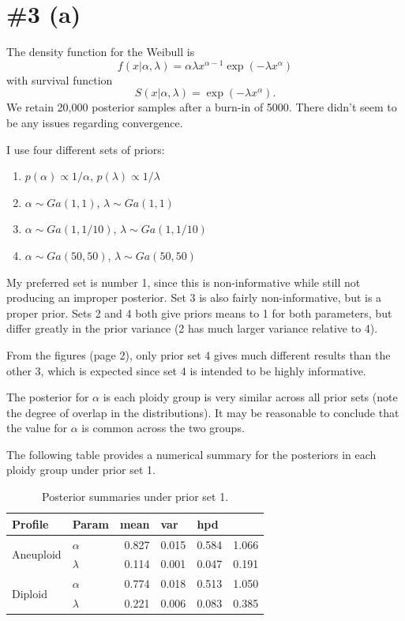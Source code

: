 \documentclass[12pt]{article}
\begin{document}
\section*{\#3 (a)}

\noindent The density function for the Weibull is 
\[ f(x|\alpha, \lambda) = \alpha\lambda x^{\alpha-1} \exp(-\lambda x^\alpha) \]
with survival function
\[ S(x|\alpha, \lambda) = \exp(-\lambda x^\alpha). \]
\noindent We retain 20,000 posterior samples after a burn-in of 5000. There didn't seem to be any issues regarding convergence.
\bigskip

\noindent I use four different sets of priors:
\begin{enumerate}
\item $p(\alpha)\propto 1/\alpha$, $p(\lambda)\propto 1/\lambda$
\item $\alpha\sim Ga(1, 1)$, $\lambda\sim Ga(1, 1)$
\item $\alpha\sim Ga(1, 1/10)$, $\lambda\sim Ga(1, 1/10)$
\item $\alpha\sim Ga(50, 50)$, $\lambda\sim Ga(50, 50)$
\end{enumerate}
\noindent My preferred set is number 1, since this is non-informative while still not producing an improper posterior. Set 3 is also fairly non-informative, but is a proper prior. Sets 2 and 4 both give priors means to 1 for both parameters, but differ greatly in the prior variance (2 has much larger variance relative to 4).
\bigskip

\noindent From the figures (page 2), only prior set 4 gives much different results than the other 3, which is expected since set 4 is intended to be highly informative.
\bigskip

\noindent The posterior for $\alpha$ is each ploidy group is very similar across all prior sets (note the degree of overlap in the distributions). It may be reasonable to conclude that the value for $\alpha$ is common across the two groups.
\bigskip

\noindent The following table provides a numerical summary for the posteriors in each ploidy group under prior set 1.
\bigskip

\begin{table}[ht]
\centering
\begin{tabular}{ll|rrrr} \hline\hline
Profile & Param & \multicolumn{1}{l}{mean} & \multicolumn{1}{l}{var} &
    \multicolumn{2}{l}{hpd} \\ \hline
\multirow{2}{*}{Aneuploid} & $\alpha$  & 0.827 & 0.015 & 0.584 & 1.066 \\
                           & $\lambda$ & 0.114 & 0.001 & 0.047  & 0.191 \\ \hline
\multirow{2}{*}{Diploid}   & $\alpha$  & 0.774 & 0.018 & 0.513 & 1.050 \\
                           & $\lambda$ & 0.221 & 0.006 & 0.083  & 0.385 \\ \hline\hline
\end{tabular}
\caption{Posterior summaries under prior set 1.}
\end{table}
\end{document}

